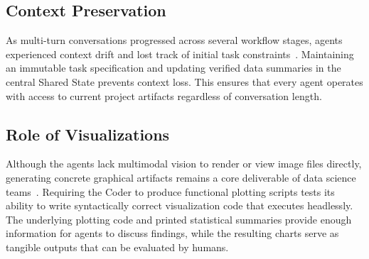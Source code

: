 \subsection{Context Preservation}
\label{subsec:context-preservation}

As multi-turn conversations progressed across several workflow stages, agents experienced context drift and lost track of initial task constraints~\cite{qian2024chatdevcommunicativeagentssoftware, yehudai2026surveyevaluationllmbasedagents}.
Maintaining an immutable task specification and updating verified data summaries in the central Shared State prevents context loss.
This ensures that every agent operates with access to current project artifacts regardless of conversation length.

\subsection{Role of Visualizations}
\label{subsec:role-of-visualizations}

Although the agents lack multimodal vision to render or view image files directly, generating concrete graphical artifacts remains a core deliverable of data science teams~\cite{yehudai2026surveyevaluationllmbasedagents}.
Requiring the Coder to produce functional plotting scripts tests its ability to write syntactically correct visualization code that executes headlessly.
The underlying plotting code and printed statistical summaries provide enough information for agents to discuss findings, while the resulting charts serve as tangible outputs that can be evaluated by humans.



